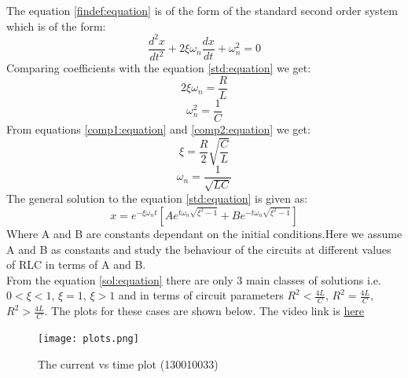 \documentclass[12pt,a4paper]{report}
\begin{document}
The equation \textcolor{blue}{\ref{findef:equation}} is of the form of the standard second order system which
is of the form:
\begin{equation}
\frac{d^2x}{dt^2}+2\xi \omega_n\frac{dx}{dt}+\omega_n ^2=0
\label{std:equation}
\end{equation}
Comparing coefficients with the equation \textcolor{blue}{\ref{std:equation}} we get:
\begin{equation}
2\xi\omega_n=\frac{R}{L}
\label{comp1:equation}
\end{equation}
\begin{equation}
\omega_n ^2=\frac{1}{C}
\label{comp2:equation}
\end{equation}
From equations \textcolor{blue}{\ref{comp1:equation}} and \textcolor{blue}{\ref{comp2:equation}} we get:
\begin{equation}
\xi=\frac{R}{2}\sqrt{\frac{C}{L}}
\label{compres1:equation}
\end{equation}
\begin{equation}
\omega_n=\frac{1}{\sqrt{LC}}
\label{compres2:equation}
\end{equation}
The general solution to the equation \textcolor{blue}{\ref{std:equation}} is given as:
\begin{equation}
x=e^{-\xi\omega_nt} [Ae^{t\omega_n\sqrt{\xi^2 - 1}}+Be^{-t\omega_n\sqrt{\xi^2 - 1}}]
\label{sol:equation}
\end{equation}
Where A and B are constants dependant on the initial conditions.Here we assume A and B as constants
and study the behaviour of the circuits at different values of RLC in terms of A and B.\\ From the equation
\textcolor{blue}{\ref{sol:equation}} there are only 3 main classes of solutions i.e. $0<\xi<1$, $\xi=1$, $\xi>1$
and in terms of circuit parameters $R^2<\frac{4L}{C}$, $R^2=\frac{4L}{C}$, $R^2>\frac{4L}{C}$. The plots for
these cases are shown below. The video link is  \textcolor{blue}{\href{run:./plots130010033_eta=0.5.mp4}{here}}
\begin{figure}[ht!]
\texttt{[image: plots.png]}
\caption{The current vs time plot (130010033)}
\label{fig:plot}
\end{figure}

\end{document}
